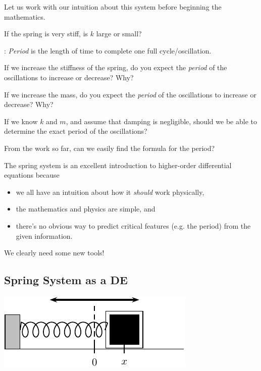 \newpage
Let us work with our intuition about this system before beginning the mathematics.

\problem If the spring is very stiff, is $k$ large or small?  \vfill

: {\em Period} is the length of time to
complete one full cycle/oscillation.  \vspace{0.2in}

\problem If we increase the stiffness of the spring, do you expect the
{\em period} of the oscillations to increase or decrease?  Why?

\vfill

If we increase the mass, do you expect
the \emph{period} of the oscillations to increase or decrease? Why?

\vfill

\newpage

\problem If we know $k$ and $m$, and assume that damping is
negligible, should we be able to determine the exact period of the
oscillations?  \vfill


\vfill

From the work so far, can we easily find the formula for the period?

\vfill

\newpage

The spring system is an excellent introduction to higher-order differential equations because 
\begin{itemize}
\item we all have an intuition about how it \emph{should} work physically,
\item the mathematics and physics are simple, and
\item there's no obvious way to predict critical features (e.g. the
  period) from the given information.
\end{itemize}
We clearly need some new tools!

\newpage
{}
\subsection*{Spring System as a DE}
\begin{center}
\includegraphics[width=0.35\linewidth]{graphics/notes_08_block}
\end{center}

